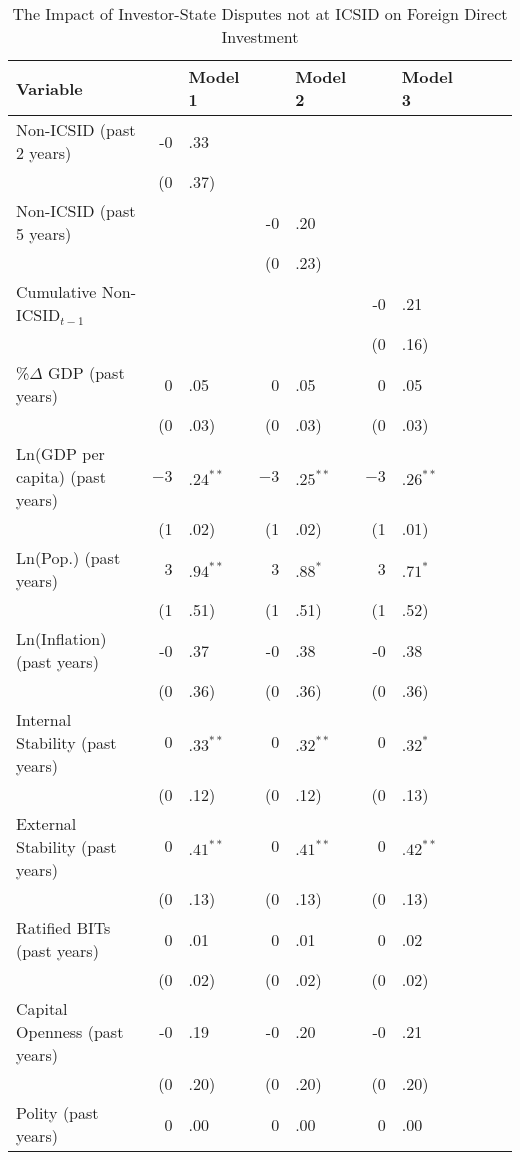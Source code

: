 \documentclass[12pt,onesided]{amsart}
\begin{document}
\begin{table}[ht]
\centering
\caption{The Impact of Investor-State Disputes not at ICSID on Foreign Direct Investment}
\label{tab:nDispFDI}
{\footnotesize
\begin{tabular}{lr@{} lr@{}lr@{}lr@{}lr@{}}
 Variable && Model 1 && Model 2 && Model 3 \\ 
  \hline
\hline
Non-ICSID (past 2 years) & -0&.33 &&  &&  \\ 
   & (0&.37) &&  &&  \\ 
  Non-ICSID (past 5 years) &&  & -0&.20 &&  \\ 
   &  && (0&.23) &&  \\ 
  Cumulative Non-ICSID$_{t-1}$ &&  &&  & -0&.21 \\ 
   &&  &&  & (0&.16) \\ 
  \%$\Delta$ GDP (past  years) & 0&.05 & 0&.05 & 0&.05 \\ 
   & (0&.03) & (0&.03) & (0&.03) \\ 
  Ln(GDP per capita) (past  years) & $-3$&$.24^{\ast\ast}$ & $-3$&$.25^{\ast\ast}$ & $-3$&$.26^{\ast\ast}$ \\ 
   & (1&.02) & (1&.02) & (1&.01) \\ 
  Ln(Pop.) (past  years) & $3$&$.94^{\ast\ast}$ & $3$&$.88^{\ast}$ & $3$&$.71^{\ast}$ \\ 
   & (1&.51) & (1&.51) & (1&.52) \\ 
  Ln(Inflation) (past  years) & -0&.37 & -0&.38 & -0&.38 \\ 
   & (0&.36) & (0&.36) & (0&.36) \\ 
  Internal Stability (past  years) & $0$&$.33^{\ast\ast}$ & $0$&$.32^{\ast\ast}$ & $0$&$.32^{\ast}$ \\ 
   & (0&.12) & (0&.12) & (0&.13) \\ 
  External Stability (past  years) & $0$&$.41^{\ast\ast}$ & $0$&$.41^{\ast\ast}$ & $0$&$.42^{\ast\ast}$ \\ 
   & (0&.13) & (0&.13) & (0&.13) \\ 
  Ratified BITs (past  years) & 0&.01 & 0&.01 & 0&.02 \\ 
   & (0&.02) & (0&.02) & (0&.02) \\ 
  Capital Openness (past  years) & -0&.19 & -0&.20 & -0&.21 \\ 
   & (0&.20) & (0&.20) & (0&.20) \\ 
  Polity (past  years) & 0&.00 & 0&.00 & 0&.00 \\ 

\end{tabular}}
\end{table}
\end{document}
